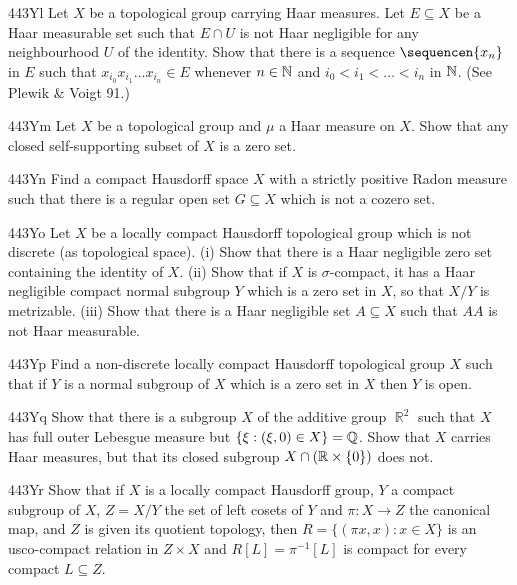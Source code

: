 {\spheader 443Yl
Let $X$ be a topological group carrying Haar measures.   Let
$E\subseteq X$ be a Haar
measurable set such that $E\cap U$ is not Haar negligible for any
neighbourhood $U$ of the identity.   Show that there is a sequence
$\sequencen{x_n}$ in $E$ such that
$x_{i_0}x_{i_1}\ldots x_{i_n}\in E$ whenever $n\in\Bbb N$ and
$i_0<i_1<\ldots<i_n$ in $\Bbb N$.   (See {\smc Plewik \& Voigt 91}.)

\spheader 443Ym Let $X$ be a topological group and $\mu$ a Haar
measure on $X$.   Show that any closed self-supporting subset of $X$ is
a zero set.   

\spheader 443Yn Find a compact Hausdorff space $X$ with a strictly
positive Radon measure such that there is a regular open set
$G\subseteq X$ which is not a cozero set.

\spheader 443Yo Let $X$ be a locally compact Hausdorff topological
group which is not discrete (as topological space).   (i) Show that there
is a Haar negligible zero set containing the identity of $X$.   (ii) Show
that if $X$ is $\sigma$-compact, it
has a Haar negligible compact normal subgroup $Y$ which is a zero
set in $X$, so that $X/Y$ is metrizable.   (iii) Show that there is a Haar
negligible set $A\subseteq X$ such that $AA$ is not Haar measurable.

\spheader 443Yp Find a
non-discrete locally compact Hausdorff topological group $X$ such
that if $Y$ is a normal subgroup of $X$ which is a zero set in $X$ then $Y$
is open.

\spheader 443Yq Show that there is a subgroup $X$ of the additive group
$\BbbR^2$ such that $X$ has full outer Lebesgue measure but
$\{\xi:(\xi,0)\in X\}=\Bbb Q$.   
Show that $X$ carries Haar measures, but that its closed subgroup
$X\cap(\Bbb R\times\{0\})$ does not.

\spheader 443Yr Show that if $X$ is a locally compact Hausdorff group,
$Y$ a compact subgroup of $X$, $Z=X/Y$ the set of left cosets of $Y$ and
$\pi:X\to Z$ the canonical map, and $Z$ is given its quotient
topology, then $R=\{(\pi x,x):x\in X\}$ is an usco-compact relation in
$Z\times X$ and $R[L]=\pi^{-1}[L]$ is compact
for every compact $L\subseteq Z$.

}
